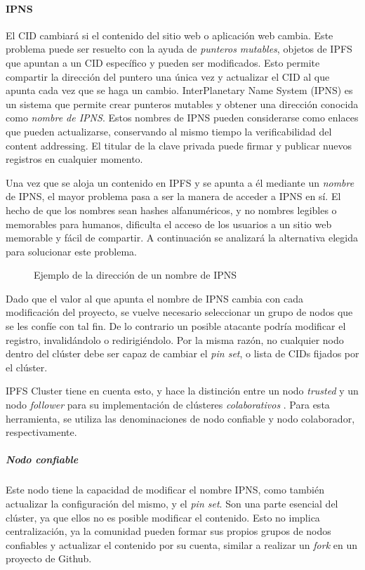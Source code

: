 \paragraph{IPNS} El CID cambiará si el contenido del sitio web o aplicación web cambia. Este problema puede ser resuelto con la ayuda de \textit{punteros mutables}, objetos de IPFS que apuntan a un CID específico y pueden ser modificados. Esto permite compartir la dirección del puntero una única vez y actualizar el CID al que apunta cada vez que se haga un cambio. InterPlanetary Name System (IPNS) \cite{ipns} es un sistema que permite crear  punteros mutables y obtener una dirección conocida como \textit{nombre de IPNS}. Estos nombres de IPNS pueden considerarse como enlaces que pueden actualizarse, conservando al mismo tiempo la verificabilidad del content addressing. El titular de la clave privada puede firmar y publicar nuevos registros en cualquier momento.

Una vez que se aloja un contenido en IPFS y se apunta a él mediante un \textit{nombre} de IPNS, el mayor problema pasa a ser la manera de acceder a IPNS en sí. El hecho de que los nombres sean hashes alfanuméricos, y no nombres legibles o memorables para humanos, dificulta el acceso de los usuarios a un sitio web memorable y fácil de compartir. A continuación se analizará la alternativa elegida para solucionar este problema.

\begin{figure}[h]
\centering
{}
\caption{Ejemplo de la dirección de un nombre de IPNS}
\end{figure}

Dado que el valor al que apunta el nombre de IPNS cambia con cada modificación del proyecto, se vuelve necesario seleccionar un grupo de nodos que se les confíe con tal fin. De lo contrario un posible atacante podría modificar el registro, invalidándolo o redirigiéndolo. Por la misma razón, no cualquier nodo dentro del clúster debe ser capaz de cambiar el \textit{pin set}, o lista de CIDs fijados por el clúster.

IPFS Cluster tiene en cuenta esto, y hace la distinción entre un nodo \textit{trusted} y un nodo \textit{follower} para su implementación de clústeres \textit{colaborativos} \cite{ipfs-cluster-collaborative}. Para esta herramienta, se utiliza las denominaciones de nodo confiable y nodo colaborador, respectivamente.

\subparagraph{Nodo confiable} Este nodo tiene la capacidad de modificar el nombre IPNS, como también actualizar la configuración del mismo, y el \textit{pin set}. Son una parte esencial del clúster, ya que ellos no es posible modificar el contenido. Esto no implica centralización, ya la comunidad pueden formar sus propios grupos de nodos confiables y actualizar el contenido por su cuenta, similar a realizar un \textit{fork} en un proyecto de Github.

